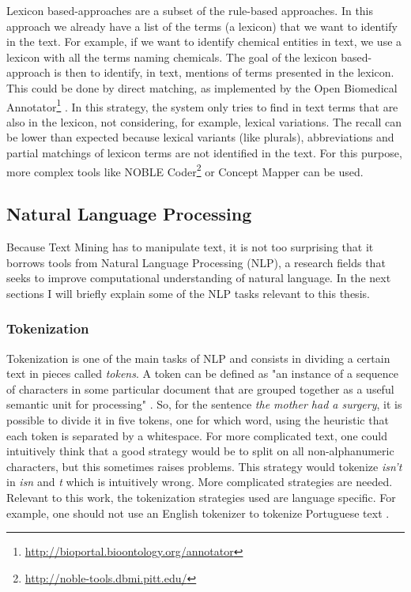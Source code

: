 Lexicon based-approaches are a subset of the rule-based approaches. In this approach we already have a list of the terms (a lexicon) that we want to identify in the text. For example, if we want to identify chemical entities in text, we use a lexicon with all the terms naming chemicals. The goal of the lexicon based-approach is then to identify, in text, mentions of terms presented in the lexicon. This could be done by direct matching, as implemented by the Open Biomedical Annotator\footnote{\url{http://bioportal.bioontology.org/annotator}} \citep{Jonquet2009}. In this strategy, the system only tries to find in text terms that are also in the lexicon, not considering, for example, lexical variations. The recall can be lower than expected because lexical variants (like plurals), abbreviations and partial matchings of lexicon terms are not identified in the text. For this purpose, more complex tools like NOBLE Coder\footnote{\url{http://noble-tools.dbmi.pitt.edu/}} \citep{Tseytlin2016} or Concept Mapper \citep{Stewart} can be used.

\subsection{Natural Language Processing}

Because Text Mining has to manipulate text, it is not too surprising that it borrows tools from Natural Language Processing (NLP), a research fields that seeks to improve computational understanding of natural language. In the next sections I will briefly explain some of the NLP tasks relevant to this thesis.

\subsubsection{Tokenization}

Tokenization is one of the main tasks of NLP and consists in dividing a certain text in pieces called \textit{tokens}. A token can be defined as "an instance
of a sequence of characters in some particular document that are grouped
together as a useful semantic unit for processing" \citep{Manning2009a}. So, for the sentence \textit{the mother had a surgery}, it is possible to divide it in five tokens, one for which word, using the heuristic that each token is separated by a whitespace. For more complicated text, one could intuitively think that a good strategy would be to split on all non-alphanumeric characters, but this sometimes raises problems. This strategy would tokenize \textit{isn't} in \textit{isn} and \textit{t} which is intuitively wrong. More complicated strategies are needed. Relevant to this work, the tokenization strategies used are language specific. For example, one should not use an English tokenizer to tokenize Portuguese text \citep{Branco2003}.

